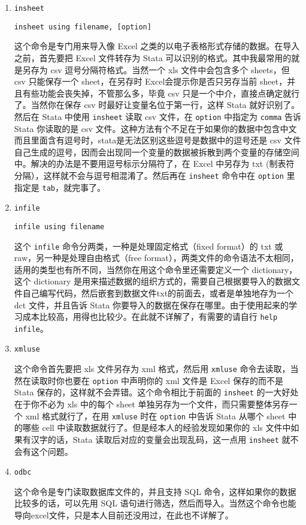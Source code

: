 \documentclass{article}
\begin{document}
\begin{enumerate}
    \item \lstinline{insheet}

\begin{lstlisting}
insheet using filename, [option]
\end{lstlisting}

这个命令是专门用来导入像 Excel 之类的以电子表格形式存储的数据。在导入之前，首先要把 Excel 文件转存为 Stata 可以识别的格式。其中我最常用的就是另存为 csv 逗号分隔符格式。当然一个 xls 文件中会包含多个 sheets，但 csv 只能保存一个 sheet，在另存时 Excel会提示你是否只另存当前 sheet，并且有些功能会丧失掉，不管那么多，毕竟 csv 只是一个中介，直接点确定就行了。当然你在保存 csv 时最好让变量名位于第一行，这样 Stata 就好识别了。然后在 Stata 中使用 \lstinline{insheet} 读取 csv 文件，在 \lstinline{option} 中指定为 \lstinline{comma} 告诉 Stata 你读取的是 csv 文件。这种方法有个不足在于如果你的数据中包含中文而且里面含有逗号时，stata是无法区别这些逗号是数据中的逗号还是 csv 文件自己生成的逗号，因而会出现同一个变量的数据被拆散到两个变量的存储空间中。解决的办法是不要用逗号标示分隔符了，在 Excel 中另存为 txt (制表符分隔），这样就不会与逗号相混淆了。然后再在 \lstinline{insheet} 命令中在 \lstinline{option} 里指定是 \lstinline{tab}，就完事了。

\item \lstinline{infile}
\begin{lstlisting}
infile using filename
\end{lstlisting}

这个 \lstinline{infile} 命令分两类，一种是处理固定格式（fixed format）的 txt 或 raw，另一种是处理自由格式（free format），两类文件的命令语法不太相同，适用的类型也有所不同，当然你在用这个命令里还需要定义一个 dictionary，这个 dictionary 是用来描述数据的组织方式的，需要自己根据要导入的数据文件自己编写代码，然后嵌套到数据文件txt的前面去，或者是单独地存为一个 dct 文件，并且告诉 Stata 你要导入的数据在保存在哪里。由于使用起来的学习成本比较高，用得也比较少。在此就不详解了，有需要的请自行 \lstinline{help infile}。

\item \lstinline{xmluse}

这个命令首先要把 xls 文件另存为 xml 格式，然后用 \lstinline{xmluse} 命令去读取，当然在读取时你也要在 \lstinline{option} 中声明你的 xml 文件是 Excel 保存的而不是 Stata 保存的，这样就不会弄错。这个命令相比于前面的 \lstinline{insheet} 的一大好处在于你不必为 xls 中的每个 sheet 单独另存为一个文件，而只需要整体另存一个 xml 格式就行了，在用 \lstinline{xmluse} 时在 \lstinline{option} 中告诉 Stata 从哪个 sheet 中的哪些 cell 中读取数据就行了。但是经本人的经验发现如果你的 xls 文件中如果有汉字的话，Stata 读取后对应的变量会出现乱码，这一点用 \lstinline{insheet} 就不会有这个问题。

\item \lstinline{odbc}

这个命令是专门读取数据库文件的，并且支持 SQL 命令，这样如果你的数据比较多的话，可以先用 SQL 语句进行筛选，然后而导入。当然这个命令也能导向excel文件，只是本人目前还没用过，在此也不详解了。

\end{enumerate}
\end{document}
